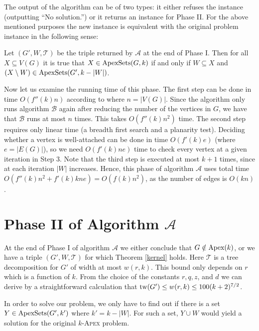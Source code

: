 \documentclass{llncs}
\begin{document}
The output of the algorithm can be of two types:
it either refuses the instance (outputting ``No solution.'')
or it returns an instance for Phase II.
For the above mentioned purposes the new instance is equivalent with the original problem instance
in the following sense:

\begin{theorem}
\label{kernel}
Let $(G',W,\mathcal{T})$ be the triple returned by $\mathcal{A}$ at the end of Phase I.
Then for all $X \subseteq V(G)$ it is true that $X \in \textup{ApexSets}(G,k)$ if and only if
$W \subseteq X$ and $(X \setminus W) \in \textup{ApexSets}(G',k-|W|)$.
\end{theorem}

Now let us examine the running time of this phase.
The first step can be done in time $O(f''(k)n)$ according to \cite{sey94,bod96,per00}
where $n=|V(G)|$.
Since the algorithm only runs algorithm
$\mathcal{B}$ again after reducing the number of the vertices in $G$,
we have that $\mathcal{B}$ runs at most $n$ times.
This takes $O(f''(k)n^2)$ time.
The second step requires only linear time (a breadth first search and a planarity test).
Deciding whether a vertex is well-attached can be done in time $O(f'(k)e)$ (where $e=|E(G)|$),
so we need $O(f'(k)ne)$ time to check every vertex at a given iteration in Step 3.
Note that the third step is executed at most $k+1$ times, since at each iteration $|W|$ increases.
Hence, this phase of algorithm $\mathcal{A}$ uses
total time $O(f''(k)n^2+f'(k)kne)=O(f(k)n^2)$, as the number of edges is $O(kn)$.

\section{Phase II of Algorithm $\mathcal{A}$}
\label{phase_II}

At the end of Phase I of algorithm $\mathcal{A}$ we either conclude that $G \notin \textup{Apex}(k)$,
or we have a triple $(G',W,\mathcal{T})$ for which Theorem \ref{kernel} holds. Here $\mathcal{T}$
is a tree decomposition for $G'$ of width at most $w(r,k)$.
This bound only depends on $r$ which is a function of $k$.
From the choice of the constants $r,q,z$, and $d$ we can derive by a straightforward calculation that
$\textup{tw}(G') \leq w(r,k) \leq 100 (k+2)^{7/2}$.

In order to solve our problem, we only have to find out if there is a set
$Y \in \textup{ApexSets}(G',k')$
where $k'=k-|W|$. For such a set, $Y \cup W$ would yield a solution for the original
$k$-\textsc{Apex} problem.
\end{document}
